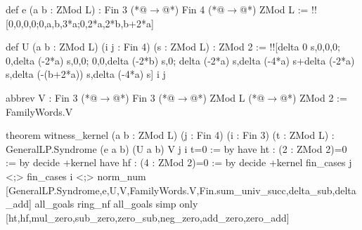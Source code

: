 def e (a b : ZMod L) : Fin 3 (*@$\to$@*) Fin 4 (*@$\to$@*) ZMod L :=
  !![0,0,0,0;0,a,b,3*a;0,2*a,2*b,b+2*a]

def U (a b : ZMod L) (i j : Fin 4) (s : ZMod L) : ZMod 2 :=
  !![delta 0 s,0,0,0;
     0,delta (-2*a) s,0,0;
     0,0,delta (-2*b) s,0;
     delta (-2*a) s,delta (-4*a) s+delta (-2*a) s,delta (-(b+2*a)) s,delta (-4*a) s] i j

abbrev V : Fin 3 (*@$\to$@*) Fin 3 (*@$\to$@*) ZMod L (*@$\to$@*) ZMod 2 := FamilyWords.V

theorem witness_kernel (a b : ZMod L) (j : Fin 4) (i : Fin 3) (t : ZMod L) :
    GeneralLP.Syndrome (e a b) (U a b) V j i t=0 := by
  have ht : (2 : ZMod 2)=0 := by decide +kernel
  have hf : (4 : ZMod 2)=0 := by decide +kernel
  fin_cases j <;> fin_cases i <;>
    norm_num [GeneralLP.Syndrome,e,U,V,FamilyWords.V,Fin.sum_univ_succ,delta_sub,delta_add]
  all_goals ring_nf
  all_goals simp only [ht,hf,mul_zero,sub_zero,zero_sub,neg_zero,add_zero,zero_add]
